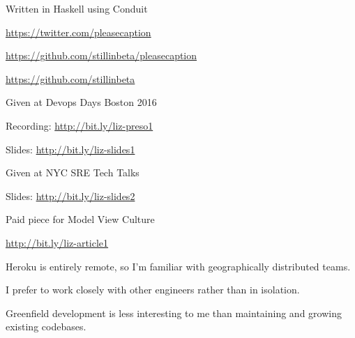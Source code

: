 \documentclass[letterpaper,11pt,notitlepage]{article}
\begin{document}
\vbar
{}
    \begin{employment}
      \item Written in Haskell using Conduit
      \item \url{https://twitter.com/pleasecaption}
      \item \url{https://github.com/stillinbeta/pleasecaption}
    \end{employment}
        \begin{employment}
           \item \url{https://github.com/stillinbeta}
        \end{employment}
\vbar

      \begin{employment}
          \item Given at Devops Days Boston 2016
          \item Recording: \url{http://bit.ly/liz-preso1}
          \item Slides: \url{http://bit.ly/liz-slides1}
      \end{employment}
      \begin{employment}
          \item Given at NYC SRE Tech Talks
          \item Slides: \url{http://bit.ly/liz-slides2}
      \end{employment}
\vbar
{}
     \begin{employment}
       \item Paid piece for Model View Culture
       \item \url{http://bit.ly/liz-article1}
       \end{employment}

\vbar
{}
\begin{description}[topsep=0mm,noitemsep]
  \item[Distributed] Heroku is entirely remote, so I'm familiar with
    geographically distributed teams.
  \item[Collaborative] I prefer to work closely with other engineers rather than
    in isolation.
  \item[Maintenance] Greenfield development is less interesting to me than maintaining
    and growing existing codebases.
\end{description}
\end{document}
